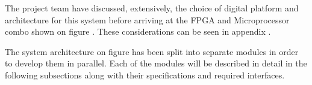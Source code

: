 The project team have discussed, extensively, the choice of digital platform and architecture for this system before arriving at the FPGA and Microprocessor combo shown on figure . These considerations can be seen in appendix .

The system architecture on figure  has been split into separate modules in order to develop them in parallel. Each of the modules will be described in detail in the following subsections along with their specifications and required interfaces.
